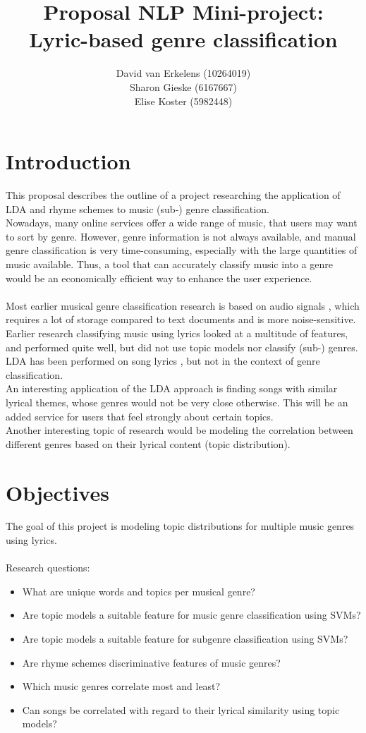 \documentclass[12pt,a4paper]{amsart}
\title{Proposal NLP Mini-project:\\ Lyric-based genre classification}
\author{David van Erkelens (10264019)\\ Sharon Gieske (6167667)\\ Elise Koster (5982448)}
\date{}
\begin{document}
\maketitle

\section{Introduction}
This proposal describes the outline of a project researching the application of LDA and rhyme schemes to music (sub-) genre classification.\\
Nowadays, many online services offer a wide range of music, that users may want to sort by genre. However, genre information is not always available, and manual genre classification is very time-consuming, especially with the large quantities of music available. Thus, a tool that can accurately classify music into a genre would be an economically efficient way to enhance the user experience.
\\\\
Most earlier musical genre classification research is based on audio signals \cite{audio_classification}, which requires a lot of storage compared to text documents and is more noise-sensitive. Earlier research classifying music using lyrics \cite{fell lyrics} looked at a multitude of features, and performed quite well, but did not use topic models nor classify (sub-) genres. LDA has been performed on song lyrics \cite{lukiccomparison}, but not in the context of genre classification.\\
An interesting application of the LDA approach is finding songs with similar lyrical themes, whose genres would not be very close otherwise. This will be an added service for users that feel strongly about certain topics.\\ 
Another interesting topic of research would be modeling the correlation between different genres based on their lyrical content (topic distribution).\\


\section{Objectives}
The goal of this project is modeling topic distributions for multiple music genres using lyrics. \\\\
Research questions:
\begin{itemize}
\item What are unique words and topics per musical genre?
\item Are topic models a suitable feature for music genre classification using SVMs?
\item Are topic models a suitable feature for subgenre classification using SVMs?
\item Are rhyme schemes discriminative features of music genres?
\item Which music genres correlate most and least?
\item Can songs be correlated with regard to their lyrical similarity using topic models?
\end{itemize}
\end{document}
